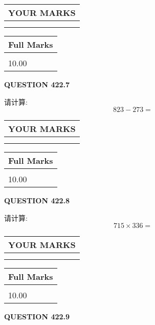 \documentclass{ctexart}
\begin{document}
\noindent\begin{tabular}{|l|}
\hline
 YOUR MARKS  \\
\hline
 \\ 
 \\ 
\hline
\end{tabular}
\hspace{0.05in} \begin{tabular}{|l|}
\hline
 Full Marks  \\
\hline
 \\ 
10.00 \\
\hline
\end{tabular}
{\textbf{\Large{QUESTION
422.7 
}}}
  
  
 
请计算:
\begin{equation}
823 -   %
273 = \nonumber
\end{equation}
 

 

 
  
\vspace{0.2in}
  
\noindent\begin{tabular}{|l|}
\hline
 YOUR MARKS  \\
\hline
 \\ 
 \\ 
\hline
\end{tabular}
\hspace{0.05in} \begin{tabular}{|l|}
\hline
 Full Marks  \\
\hline
 \\ 
10.00 \\
\hline
\end{tabular}
{\textbf{\Large{QUESTION
422.8 
}}}
  
  
 
请计算:
\begin{equation}
715  \times    %
336 = \nonumber
\end{equation}
 

 

 
  
\vspace{0.2in}
  
\noindent\begin{tabular}{|l|}
\hline
 YOUR MARKS  \\
\hline
 \\ 
 \\ 
\hline
\end{tabular}
\hspace{0.05in} \begin{tabular}{|l|}
\hline
 Full Marks  \\
\hline
 \\ 
10.00 \\
\hline
\end{tabular}
{\textbf{\Large{QUESTION
422.9 
}}}
  
\end{document}
